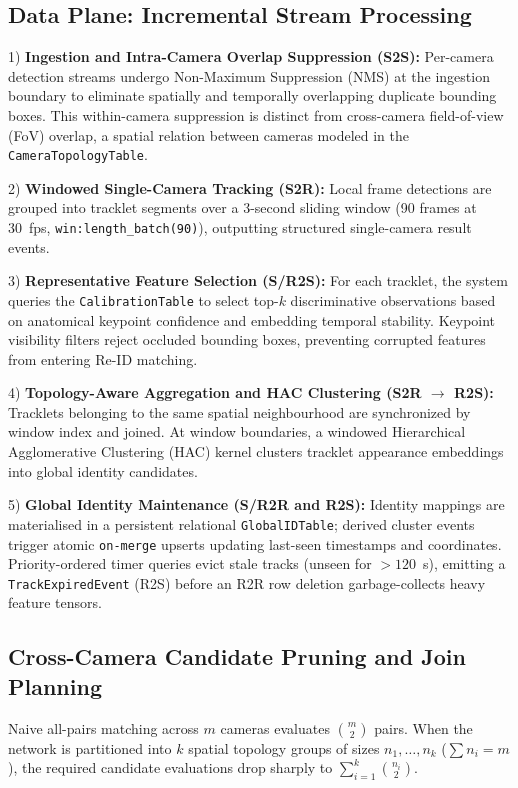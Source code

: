 \documentclass[conference]{IEEEtran}
\begin{document}
\subsection{Data Plane: Incremental Stream Processing}
1) \textbf{Ingestion and Intra-Camera Overlap Suppression (S2S):} Per-camera detection streams undergo Non-Maximum Suppression (NMS) at the ingestion boundary to eliminate spatially and temporally overlapping duplicate bounding boxes. This within-camera suppression is distinct from cross-camera field-of-view (FoV) overlap, a spatial relation between cameras modeled in the \texttt{CameraTopologyTable}.

2) \textbf{Windowed Single-Camera Tracking (S2R):} Local frame detections are grouped into tracklet segments over a 3-second sliding window (90 frames at 30~fps, \texttt{win:length\_batch(90)}), outputting structured single-camera result events.

3) \textbf{Representative Feature Selection (S/R2S):} For each tracklet, the system queries the \texttt{CalibrationTable} to select top-$k$ discriminative observations based on anatomical keypoint confidence and embedding temporal stability. Keypoint visibility filters reject occluded bounding boxes, preventing corrupted features from entering Re-ID matching.

4) \textbf{Topology-Aware Aggregation and HAC Clustering (S2R $\to$ R2S):} Tracklets belonging to the same spatial neighbourhood are synchronized by window index and joined. At window boundaries, a windowed Hierarchical Agglomerative Clustering (HAC) kernel clusters tracklet appearance embeddings into global identity candidates.

5) \textbf{Global Identity Maintenance (S/R2R and R2S):} Identity mappings are materialised in a persistent relational \texttt{GlobalIDTable}; derived cluster events trigger atomic \texttt{on-merge} upserts updating last-seen timestamps and coordinates. Priority-ordered timer queries evict stale tracks (unseen for $>120$~s), emitting a \texttt{TrackExpiredEvent} (R2S) before an R2R row deletion garbage-collects heavy feature tensors.

\subsection{Cross-Camera Candidate Pruning and Join Planning}
Naive all-pairs matching across $m$ cameras evaluates $\binom{m}{2}$ pairs. When the network is partitioned into $k$ spatial topology groups of sizes $n_1, \dots, n_k$ ($\sum n_i = m$), the required candidate evaluations drop sharply to $\sum_{i=1}^{k} \binom{n_i}{2}$.
\end{document}
